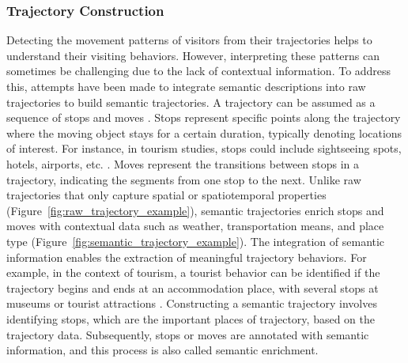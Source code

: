 \documentclass{article}
\theoremstyle{remark}
\begin{document}
 
\subsubsection{Trajectory Construction}
Detecting the movement patterns of visitors from their trajectories helps to understand their visiting behaviors. However, interpreting these patterns can sometimes be challenging due to the lack of contextual information. To address this, attempts have been made to integrate semantic descriptions into raw trajectories to build semantic trajectories. A trajectory can be assumed as a sequence of stops and moves \citep{spaccapietra_conceptual_2008}. Stops represent specific points along the trajectory where the moving object stays for a certain duration, typically denoting locations of interest. For instance, in tourism studies, stops could include sightseeing spots, hotels, airports, etc. \citep{yuan_review_2017}. Moves represent the transitions between stops in a trajectory, indicating the segments from one stop to the next. Unlike raw trajectories that only capture spatial or spatiotemporal properties (Figure~\ref{fig:raw_trajectory_example}), semantic trajectories enrich stops and moves with contextual data such as weather, transportation means, and place type (Figure~\ref{fig:semantic_trajectory_example}). The integration of semantic information enables the extraction of meaningful trajectory behaviors. For example, in the context of tourism, a tourist behavior can be identified if the trajectory begins and ends at an accommodation place, with several stops at museums or tourist attractions \citep{parent_semantic_2013}. Constructing a semantic trajectory involves identifying stops, which are the important places of trajectory, based on the trajectory data. Subsequently, stops or moves are annotated with semantic information, and this process is also called semantic enrichment.
\end{document}
